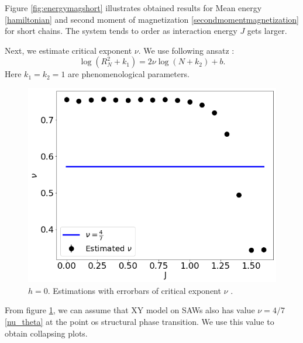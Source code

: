 Figure \ref{fig:energymagshort} illustrates obtained results for Mean energy \eqref{hamiltonian} and   second moment of magnetization \eqref{secondmomentmagnetization} for short chains. The system tends to order as interaction energy $J$ gets larger. 

Next, we estimate critical exponent $\nu$. We use following ansatz  \cite{Berretti1985}:
\begin{equation}
\label{berettiscale}
\log (R_N^2+k_1 ) = 2 \nu \log (N+k_2) + b.
\end{equation}
Here $k_1=k_2=1$ are phenomenological parameters. 
 \begin{figure}[H]
	\centering
	\includegraphics[scale=0.36]{Images/nu_shortchains.png}
	\caption{$h=0$. Estimations with errorbars of critical exponent $\nu$ .   }
	\label{fig:nushort}
\end{figure}
From figure \ref{fig:nushort}, we can assume that XY model on SAWs also has value $\nu = 4/7$ \eqref{nu_theta} at the point os structural phase transition. We use this value to obtain collapsing plots. 
